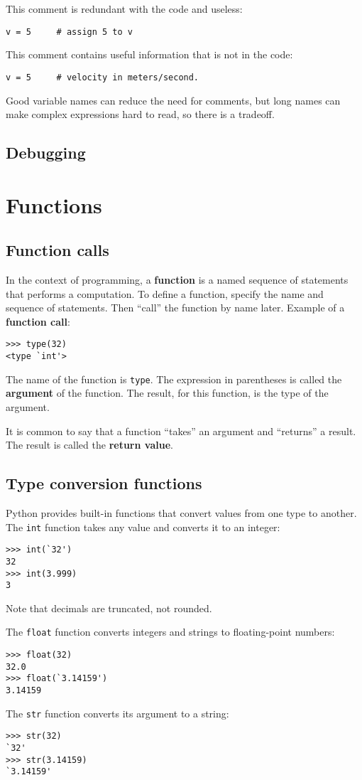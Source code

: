 \documentclass{article}
\begin{document}
This comment is redundant with the code and useless:
\begin{verbatim}
v = 5     # assign 5 to v
\end{verbatim}
This comment contains useful information that is not in the code:
\begin{verbatim}
v = 5     # velocity in meters/second.
\end{verbatim}
Good variable names can reduce the need for comments, but long names
can make complex expressions hard to read, so there is a tradeoff.

\subsection{Debugging}

\section{Functions}
\subsection{Function calls}
In the context of programming, a \textbf{function} is a named
sequence of statements that performs a computation.
To define a function, specify the name and sequence of
statements. Then ``call'' the function by name later.
Example of a \textbf{function call}:
\begin{verbatim}
>>> type(32)
<type `int'>
\end{verbatim}
The name of the function is \verb|type|. The expression in
parentheses is called the \textbf{argument} of the function.
The result, for this function, is the type of the argument.

It is common to say that a function ``takes'' an argument and
``returns'' a result. The result is called the \textbf{return value}.
\subsection{Type conversion functions}
Python provides built-in functions that convert values from
one type to another. The \verb|int| function takes any value
and converts it to an integer:
\begin{verbatim}
>>> int(`32')
32
>>> int(3.999)
3
\end{verbatim}
Note that decimals are truncated, not rounded.

The \verb|float| function converts integers and strings to
floating-point numbers:
\begin{verbatim}
>>> float(32)
32.0
>>> float(`3.14159')
3.14159
\end{verbatim}
The \verb|str| function converts its argument to a string:
\begin{verbatim}
>>> str(32)
`32'
>>> str(3.14159)
`3.14159'
\end{verbatim}
\end{document}
